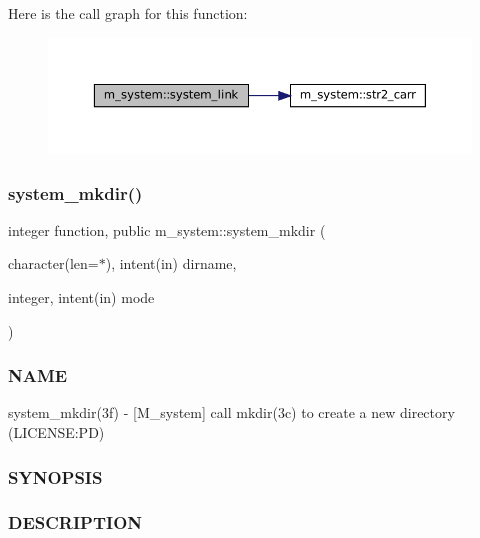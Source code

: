 Here is the call graph for this function\+:\nopagebreak
\begin{figure}[H]
\begin{center}
\leavevmode
\includegraphics[width=350pt]{namespacem__system_a0e04b5499fc3367eda9758b6e396a103_cgraph}
\end{center}
\end{figure}
\mbox{\label{namespacem__system_a084d644c236d22af2cc75c6e48fd6e96}} 
\subsubsection{\texorpdfstring{system\+\_\+mkdir()}{system\_mkdir()}}
{\footnotesize\ttfamily integer function, public m\+\_\+system\+::system\+\_\+mkdir (\begin{DoxyParamCaption}\item[{character(len=$\ast$), intent(in)}]{dirname,  }\item[{integer, intent(in)}]{mode }\end{DoxyParamCaption})}



\subsubsection*{N\+A\+ME}

system\+\_\+mkdir(3f) -\/ \mbox{[}M\+\_\+system\mbox{]} call mkdir(3c) to create a new directory (L\+I\+C\+E\+N\+SE\+:PD) \subsubsection*{S\+Y\+N\+O\+P\+S\+IS}

\subsubsection*{D\+E\+S\+C\+R\+I\+P\+T\+I\+ON}

